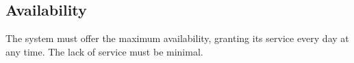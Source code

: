 \documentclass[../../../RASD.tex]{subfiles}
\begin{document}
\subsection{Availability\label{sect:3.5.2}}

The system must offer the maximum availability, granting its service every day at any time. The lack of service must be minimal. 
\end{document}
